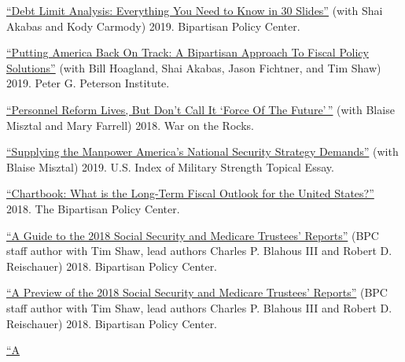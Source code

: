 \documentclass[
  11pt,
]
{article}
\renewenvironment{itemize}{
  \begin{list}{}{
    \setlength{\leftmargin}{1.5em}
  }
}{
  \end{list}
}
\begin{document}
\begin{itemize}
\item
  \href{https://bipartisanpolicy.org/download/?file=/wp-content/uploads/2019/07/Debt-Limit-Analysis-Everything-You-Need-to-Know-in-30-Slides.pdf}{``Debt
  Limit Analysis: Everything You Need to Know in 30 Slides''} (with Shai
  Akabas and Kody Carmody) 2019. Bipartisan Policy Center.
\item
  \href{https://bipartisanpolicy.org/download/?file=/wp-content/uploads/2019/09/PGPF-Bipartisan-Policy-Center-Solutions-Initiative-2019-Report.pdf}{``Putting
  America Back On Track: A Bipartisan Approach To Fiscal Policy
  Solutions''} (with Bill Hoagland, Shai Akabas, Jason Fichtner, and Tim
  Shaw) 2019. Peter G. Peterson Institute.
\item
  \href{https://warontherocks.com/2018/08/personnel-reform-lives-but-dont-call-it-force-of-the-future/}{``Personnel
  Reform Lives, But Don't Call It `Force Of The Future'\,''} (with
  Blaise Misztal and Mary Farrell) 2018. War on the Rocks.
\item
  \href{https://www.heritage.org/sites/default/files/2018-09/2019_IndexOfUSMilitaryStrength_CHAPTERS_MISZTAL-RAMETTA.pdf}{``Supplying
  the Manpower America's National Security Strategy Demands''} (with
  Blaise Misztal) 2019. U.S. Index of Military Strength Topical Essay.
\item
  \href{https://bipartisanpolicy.org/download/?file=/wp-content/uploads/2019/03/What-is-the-Long-Term-Fiscal-Outlook-for-the-United-States.pdf}{``Chartbook:
  What is the Long-Term Fiscal Outlook for the United States?''} 2018.
  The Bipartisan Policy Center.
\item
  \href{https://bipartisanpolicy.org/download/?file=/wp-content/uploads/2019/03/A-Guide-to-the-2018-Social-Security-and-Medicare-Trustees-Reports.pdf}{``A
  Guide to the 2018 Social Security and Medicare Trustees' Reports''}
  (BPC staff author with Tim Shaw, lead authors Charles P. Blahous III
  and Robert D. Reischauer) 2018. Bipartisan Policy Center.
\item
  \href{https://bipartisanpolicy.org/download/?file=/wp-content/uploads/2019/03/Preview-2018-Trustees-Report.pdf}{``A
  Preview of the 2018 Social Security and Medicare Trustees' Reports''}
  (BPC staff author with Tim Shaw, lead authors Charles P. Blahous III
  and Robert D. Reischauer) 2018. Bipartisan Policy Center.
\item
  \href{https://bipartisanpolicy.org/download/?file=/wp-content/uploads/2019/03/BPC-Economy-A-Guide-to-the-2017-Social-Security-and-Medicare-Trustees-Reports.pdf}{``A
}
\end{itemize}
\end{document}
